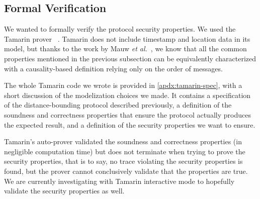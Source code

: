 \subsection{Formal Verification}

We wanted to formally verify the protocol security properties. We used the Tamarin prover ~\cite{meier2013tamarin}. Tamarin does not include timestamp and location data in its model, but thanks to the work by Mauw \emph{et al.}~\cite{TamarinDB}, we know that all the common properties mentioned in the previous subsection can be equivalently characterized with a causality-based definition relying only on the order of messages.

The whole Tamarin code we wrote is provided in \cref{apdx:tamarin-spec}, with a short discussion of the modelization choices we made. It contains a specification of the distance-bounding protocol described previously, a definition of the soundness and correctness properties that ensure the protocol actually produces the expected result, and a definition of the security properties we want to ensure.

Tamarin's auto-prover validated the soundness and correctness properties (in negligible computation time) but does not terminate when trying to prove the security properties, that is to say, no trace violating the security properties is found, but the prover cannot conclusively validate that the properties are true. We are currently investigating with Tamarin interactive mode to hopefully validate the security properties as well.


